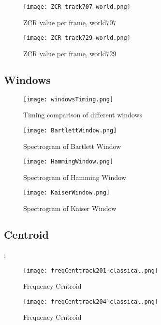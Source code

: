 \documentclass{article} %
\begin{document}
\begin{figure}
\centering
\texttt{[image: ZCR\_track707-world.png]}
\caption{ZCR value per frame, world707}
\label{fig:ZCR_707}
\end{figure}


\begin{figure}[h!]
\centering
\texttt{[image: ZCR\_track729-world.png]}
\caption{ZCR value per frame, world729}
\label{fig:ZCR_729}
\end{figure}

\clearpage
\subsection{Windows}

\begin{figure}[ht!]
\centering
\texttt{[image: windowsTiming.png]}
\caption{Timing comparison of different windows}
\label{fig:windowsTimings}
\end{figure}


\begin{figure}[H]
\centering
\texttt{[image: BartlettWindow.png]}
\caption{Spectrogram of Bartlett Window}
\label{fig:bartWindows}
\end{figure}


\begin{figure}[H]
\centering
\texttt{[image: HammingWindow.png]}
\caption{Spectrogram of Hamming Window}
\label{fig:hamWindows}
\end{figure}

\begin{figure}[H]
\centering
\texttt{[image: KaiserWindow.png]}
\caption{Spectrogram of Kaiser Window}
\label{fig:kaiserWindows}
\end{figure}

\clearpage
\subsection{Centroid}
\label{sec:centroid};

\begin{figure}[H]
\centering
\texttt{[image: freqCenttrack201-classical.png]}
\caption{Frequency Centroid}
\label{fig:centr201}
\end{figure}

\begin{figure}[H]
\centering
\texttt{[image: freqCenttrack204-classical.png]}
\caption{Frequency Centroid}
\label{fig:centr204}
\end{figure}
\end{document}
